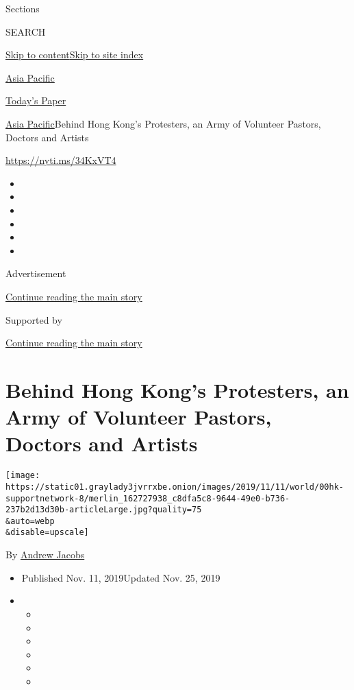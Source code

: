 Sections

SEARCH

\protect\hyperlink{site-content}{Skip to
content}\protect\hyperlink{site-index}{Skip to site index}

\href{https://www.nytimes3xbfgragh.onion/section/world/asia}{Asia
Pacific}

\href{https://myaccount.nytimes3xbfgragh.onion/auth/login?response_type=cookie\&client_id=vi}{}

\href{https://www.nytimes3xbfgragh.onion/section/todayspaper}{Today's
Paper}

\href{/section/world/asia}{Asia Pacific}\textbar{}Behind Hong Kong's
Protesters, an Army of Volunteer Pastors, Doctors and Artists

\url{https://nyti.ms/34KxVT4}

\begin{itemize}
\item
\item
\item
\item
\item
\item
\end{itemize}

Advertisement

\protect\hyperlink{after-top}{Continue reading the main story}

Supported by

\protect\hyperlink{after-sponsor}{Continue reading the main story}

\hypertarget{behind-hong-kongs-protesters-an-army-of-volunteer-pastors-doctors-and-artists}{%
\section{Behind Hong Kong's Protesters, an Army of Volunteer Pastors,
Doctors and
Artists}\label{behind-hong-kongs-protesters-an-army-of-volunteer-pastors-doctors-and-artists}}

\texttt{[image: https://static01.graylady3jvrrxbe.onion/images/2019/11/11/world/00hk-supportnetwork-8/merlin\_162727938\_c8dfa5c8-9644-49e0-b736-237b2d13d30b-articleLarge.jpg?quality=75\\\&auto=webp\\\&disable=upscale]}

By \href{https://www.nytimes3xbfgragh.onion/by/andrew-jacobs}{Andrew
Jacobs}

\begin{itemize}
\item
  Published Nov. 11, 2019Updated Nov. 25, 2019
\item
  \begin{itemize}
  \item
  \item
  \item
  \item
  \item
  \item
  \end{itemize}
\end{itemize}

